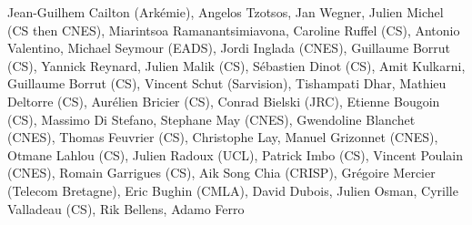 Jean-Guilhem Cailton (Ark\'emie), Angelos Tzotsos, Jan Wegner, Julien Michel (CS then CNES), Miarintsoa Ramanantsimiavona, Caroline Ruffel (CS), Antonio Valentino, Michael Seymour (EADS), Jordi Inglada (CNES), Guillaume Borrut (CS), Yannick Reynard, Julien Malik (CS), S\'ebastien Dinot (CS), Amit Kulkarni, Guillaume Borrut (CS), Vincent Schut (Sarvision), Tishampati Dhar, Mathieu Deltorre (CS), Aur\'elien Bricier (CS), Conrad Bielski (JRC), Etienne Bougoin (CS), Massimo Di Stefano, Stephane May (CNES), Gwendoline Blanchet (CNES), Thomas Feuvrier (CS), Christophe Lay, Manuel Grizonnet (CNES), Otmane Lahlou (CS), Julien Radoux (UCL), Patrick Imbo (CS), Vincent Poulain (CNES), Romain Garrigues (CS), Aik Song Chia (CRISP), Gr\'egoire Mercier (Telecom Bretagne), Eric Bughin (CMLA), David Dubois, Julien Osman, Cyrille Valladeau (CS), Rik Bellens, Adamo Ferro